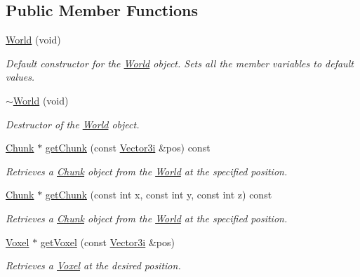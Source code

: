 \subsection*{Public Member Functions}
\begin{DoxyCompactItemize}
\item 
\hyperlink{classsparky_1_1_world_a29fa569fb27b55eb793a442d3d493b60}{World} (void)\hypertarget{classsparky_1_1_world_a29fa569fb27b55eb793a442d3d493b60}{}\label{classsparky_1_1_world_a29fa569fb27b55eb793a442d3d493b60}

\begin{DoxyCompactList}\small\item\em Default constructor for the \hyperlink{classsparky_1_1_world}{World} object. Sets all the member variables to default values. \end{DoxyCompactList}\item 
\hyperlink{classsparky_1_1_world_af8f97ee0ba00d5803b0be8d6e9049e09}{$\sim$\+World} (void)
\begin{DoxyCompactList}\small\item\em Destructor of the \hyperlink{classsparky_1_1_world}{World} object. \end{DoxyCompactList}\item 
\hyperlink{classsparky_1_1_chunk}{Chunk} $\ast$ \hyperlink{classsparky_1_1_world_a69ff5f592e3d8b7a2ff1a5e5f2c3255a}{get\+Chunk} (const \hyperlink{classsparky_1_1_vector3}{Vector3i} \&pos) const 
\begin{DoxyCompactList}\small\item\em Retrieves a \hyperlink{classsparky_1_1_chunk}{Chunk} object from the \hyperlink{classsparky_1_1_world}{World} at the specified position. \end{DoxyCompactList}\item 
\hyperlink{classsparky_1_1_chunk}{Chunk} $\ast$ \hyperlink{classsparky_1_1_world_a7a03696f9ea23c6a9dad10c623e0cfd9}{get\+Chunk} (const int x, const int y, const int z) const 
\begin{DoxyCompactList}\small\item\em Retrieves a \hyperlink{classsparky_1_1_chunk}{Chunk} object from the \hyperlink{classsparky_1_1_world}{World} at the specified position. \end{DoxyCompactList}\item 
\hyperlink{classsparky_1_1_voxel}{Voxel} $\ast$ \hyperlink{classsparky_1_1_world_ab713163d643ebb4aac0f6ff03b5b6924}{get\+Voxel} (const \hyperlink{classsparky_1_1_vector3}{Vector3i} \&pos)
\begin{DoxyCompactList}\small\item\em Retrieves a \hyperlink{classsparky_1_1_voxel}{Voxel} at the desired position. \end{DoxyCompactList}\item 

\end{DoxyCompactItemize}
